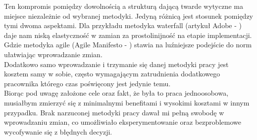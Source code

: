 Ten kompromis pomiędzy dowolnością a strukturą dającą twarde wytyczne ma miejsce niezależnie od wybranej metodyki. Jedyną różnicą jest stosunek pomiędzy tymi dwoma aspektami. Dla przykładu metodyka waterfall (artykuł Adobe - \cite{waterfall}) daje nam niską elastyczność w zamian za prostolinijność na etapie implementacji. Gdzie metodyka agile (Agile Manifesto - \cite{agilemanifesto}) stawia na luźniejsze podejście do norm ułatwiając wprowadzanie zmian.\\

Dodatkowo samo wprowadzanie i trzymanie się danej metodyki pracy jest kosztem samy w sobie, często wymagającym zatrudnienia dodatkowego pracownika którego czas poświęcony jest jedynie temu.\\

Biorąc pod uwagę założone cele oraz fakt, że była to praca jednoosobowa, musiałbym zmierzyć się z minimalnymi benefitami i wysokimi kosztami w innym przypadku. Brak narzuconej metodyki pracy dawał mi pełną swobodę w wprowadzaniu zmian, co umożliwiało eksperymentowanie oraz bezproblemowe wycofywanie się z błędnych decyzji.
